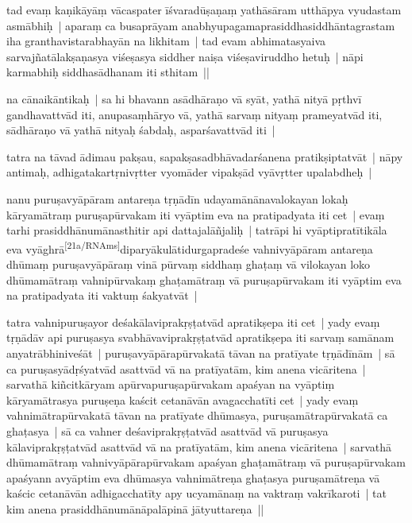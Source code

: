 \documentclass[article,a4paper]{memoir}
\begin{document}
	  \pstart tad evaṃ kaṇikā\-yā\-ṃ vā\-caspater ī\-śvaradū\-ṣaṇaṃ yathā\-sā\-ram utthā\-pya vyudastam asmā\-bhiḥ | aparaṃ ca busaprā\-yam anabhyupagamaprasiddhasiddhā\-ntagrastam iha granthavistarabhayā\-n na likhitam | tad evam abhimatasyaiva sarvajñatā\-lakṣaṇasya viśeṣasya siddher naiṣa viśeṣaviruddho hetuḥ | nā\-pi karmabhiḥ siddhasā\-dhanam iti sthitam || 
	\pend
      

	  \pstart {}\label{thakur75-36.21} na cā\-naikā\-ntikaḥ | sa hi bhavann asā\-dhā\-raṇo vā\- syā\-t, yathā\- nityā\- pṛthvī\- gandhavattvā\-d iti, anupasaṃhā\-ryo vā\-, yathā\- sarvaṃ nityaṃ prameyatvā\-d iti, sā\-dhā\-raṇo vā\- yathā\- nityaḥ śabdaḥ, asparśavattvā\-d iti |
	\pend
      

	  \pstart tatra na tā\-vad ā\-dimau pakṣau, sapakṣasadbhā\-vadarśanena pratikṣiptatvā\-t | nā\-py antimaḥ, adhigatakartṛnivṛtter vyomā\-der vipakṣā\-d vyā\-vṛtter upalabdheḥ | 
	\pend
      

	  \pstart nanu puruṣavyā\-pā\-ram antareṇa tṛṇā\-dī\-n udayamā\-nā\-navalokayan lokaḥ kā\-ryamā\-traṃ puruṣapū\-rvakam iti vyā\-ptim eva na pratipadyata iti cet | evaṃ tarhi prasiddhā\-numā\-nasthitir api dattajalā\-ñjaliḥ | tatrā\-pi hi vyā\-ptipratī\-tikā\-la eva vyā\-ghrā\-\leavevmode\textsuperscript{\rmlatinfont\tiny [21a/RNAms]}\label{RNAms_21a}diparyā\-kulā\-tidurgapradeśe vahnivyā\-pā\-ram antareṇa dhū\-maṃ puruṣavyā\-pā\-raṃ vinā\- pū\-rvaṃ siddhaṃ ghaṭaṃ vā\- vilokayan loko dhū\-mamā\-traṃ vahnipū\-rvakaṃ ghaṭamā\-traṃ vā\- puruṣapū\-rvakam iti vyā\-ptim eva na pratipadyata iti vaktuṃ śakyatvā\-t |
	\pend
      

	  \pstart tatra vahnipuruṣayor deśakā\-laviprakṛṣṭatvā\-d apratikṣepa iti cet | yady evaṃ tṛṇā\-dā\-v api puruṣasya svabhā\-vaviprakṛṣṭatvā\-d apratikṣepa iti sarvaṃ samā\-nam anyatrā\-bhiniveśā\-t | puruṣavyā\-pā\-rapū\-rvakatā\- tā\-van na pratī\-yate tṛṇā\-dī\-nā\-m | sā\- ca puruṣasyā\-dṛśyatvā\-d asattvā\-d vā\- na pratī\-yatā\-m, kim anena vicā\-ritena | sarvathā\- kiñcitkā\-ryam apū\-rvapuruṣapū\-rvakam apaśyan na vyā\-ptiṃ kā\-ryamā\-trasya puruṣeṇa kaścit cetanā\-vā\-n avagacchatī\-ti cet | yady evaṃ vahnimā\-trapū\-rvakatā\- tā\-van na pratī\-yate dhū\-masya, puruṣamā\-trapū\-rvakatā\- ca ghaṭasya | sā\- ca vahner deśaviprakṛṣṭatvā\-d asattvā\-d vā\- puruṣasya kā\-laviprakṛṣṭatvā\-d asattvā\-d vā\- na pratī\-yatā\-m, kim anena vicā\-ritena | sarvathā\- dhū\-mamā\-traṃ vahnivyā\-pā\-rapū\-rvakam apaśyan ghaṭamā\-traṃ vā\- puruṣapū\-rvakam apaśyann avyā\-ptim eva dhū\-masya vahnimā\-treṇa ghaṭasya puruṣamā\-treṇa vā\- kaścic cetanā\-vā\-n adhigacchatī\-ty apy ucyamā\-naṃ na vaktraṃ vakrī\-karoti | tat kim anena prasiddhā\-numā\-nā\-palā\-pinā\- jā\-tyuttareṇa ||
	\pend
      
\end{document}
